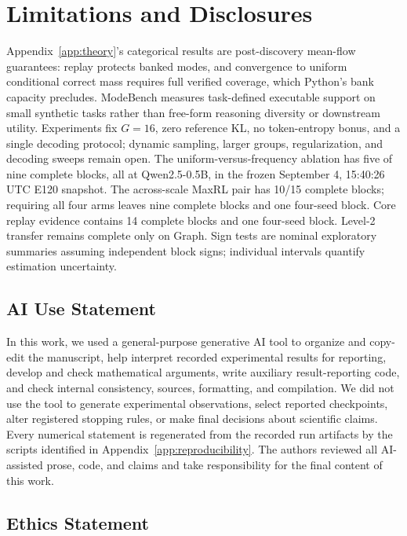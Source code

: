 \section{Limitations and Disclosures}
\label{app:limitations}

Appendix~\ref{app:theory}'s categorical results are
post-discovery mean-flow guarantees: replay protects banked modes, and
convergence to uniform conditional correct mass requires full verified
coverage, which Python's bank capacity precludes. ModeBench measures
task-defined executable support on small synthetic tasks rather than free-form
reasoning diversity or downstream utility. Experiments fix \(G=16\), zero
reference KL, no token-entropy bonus, and a single decoding protocol; dynamic
sampling, larger groups, regularization, and decoding sweeps remain open. The
uniform-versus-frequency ablation has five of nine complete blocks, all at
Qwen2.5-0.5B, in the frozen September 4, 15:40:26 UTC E120 snapshot. The across-scale
MaxRL pair has 10/15 complete blocks; requiring all four arms leaves nine
complete blocks and one four-seed block. Core replay evidence contains 14
complete blocks and one four-seed block. Level-2 transfer remains complete
only on Graph. Sign tests are nominal exploratory summaries assuming
independent block signs; individual intervals quantify estimation uncertainty.

\subsection{AI Use Statement}
\label{sec:ai-use}

In this work, we used a general-purpose generative AI tool to organize and
copy-edit the manuscript, help interpret recorded experimental results for
reporting, develop and check mathematical arguments, write auxiliary
result-reporting code, and check internal consistency, sources, formatting,
and compilation. We did not use the tool to
generate experimental observations, select reported checkpoints, alter
registered stopping rules, or make final decisions about scientific claims.
Every numerical statement is regenerated from the recorded run artifacts by
the scripts identified in Appendix~\ref{app:reproducibility}. The authors
reviewed all AI-assisted prose, code, and claims and take responsibility for the
final content of this work.

\subsection{Ethics Statement}

